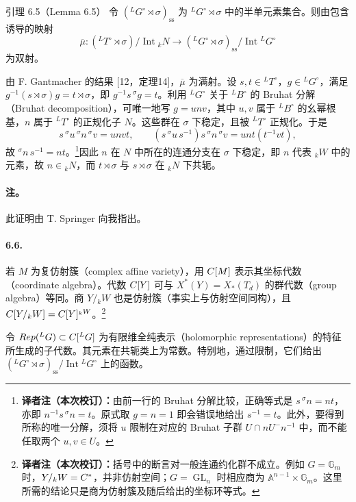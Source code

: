 \begin{originaltheorem}{引理 6.5（Lemma 6.5）}
令 $({}^LG^\circ\rtimes\sigma)_{\mathrm{ss}}$ 为 ${}^LG^\circ\rtimes\sigma$ 中的半单元素集合。则由包含诱导的映射
\[
 \overline\mu:({}^LT^\circ\rtimes\sigma)/\operatorname{Int}{}_kN
 \longrightarrow({}^LG^\circ\rtimes\sigma)_{\mathrm{ss}}/\operatorname{Int}{}^LG^\circ
\]
为双射。
\end{originaltheorem}
由 F. Gantmacher 的结果 [12，定理14]，$\overline\mu$ 为满射。设 $s,t\in{}^LT^\circ$，$g\in{}^LG^\circ$，满足 $g^{-1}(s\rtimes\sigma)g=t\rtimes\sigma$，即 $g^{-1}s\,{}^\sigma g=t$。利用 ${}^LG^\circ$ 关于 ${}^LB^\circ$ 的 Bruhat 分解（Bruhat decomposition），可唯一地写 $g=unv$，其中 $u,v$ 属于 ${}^LB^\circ$ 的幺幂根基，$n$ 属于 ${}^LT^\circ$ 的正规化子 $N$。这些群在 $\sigma$ 下稳定，且被 ${}^LT^\circ$ 正规化。于是
\[
 s\,{}^\sigma u\,{}^\sigma n\,{}^\sigma v=unvt,\qquad
 (s\,{}^\sigma u\,s^{-1})s\,{}^\sigma n\,{}^\sigma v=unt(t^{-1}vt),
\]
故 ${}^\sigma n\,s^{-1}=nt$。\footnote{\textbf{译者注（本次校订）：}由前一行的 Bruhat 分解比较，正确等式是 $s\,{}^\sigma n=nt$，亦即 $n^{-1}s\,{}^\sigma n=t$。原式取 $g=n=1$ 即会错误地给出 $s^{-1}=t$。此外，要得到所称的唯一分解，须将 $u$ 限制在对应的 Bruhat 子群 $U\cap nU^-n^{-1}$ 中，而不能任取两个 $u,v\in U$。}因此 $n$ 在 $N$ 中所在的连通分支在 $\sigma$ 下稳定，即 $n$ 代表 ${}_kW$ 中的元素，故 $n\in{}_kN$，而 $t\rtimes\sigma$ 与 $s\rtimes\sigma$ 在 ${}_kN$ 下共轭。

\paragraph*{注。} 此证明由 T. Springer 向我指出。

\paragraph*{6.6.} 若 $M$ 为复仿射簇（complex affine variety），用 $C[M]$ 表示其坐标代数（coordinate algebra）。代数 $C[Y]$ 可与 $X^*(Y)=X_*(T_d)$ 的群代数（group algebra）等同。商 $Y/{}_kW$ 也是仿射簇（事实上与仿射空间同构），且 $C[Y/{}_kW]=C[Y]^{{}_kW}$。\footnote{\textbf{译者注（本次校订）：}括号中的断言对一般连通约化群不成立。例如 $G=\mathbb G_m$ 时，$Y/{}_kW=C^*$，并非仿射空间；$G=\operatorname{GL}_n$ 时相应商为 $\mathbb A^{n-1}\times\mathbb G_m$。这里所需的结论只是商为仿射簇及随后给出的坐标环等式。}

令 $Rep({}^LG)\subset C[{}^LG]$ 为有限维全纯表示（holomorphic representations）的特征所生成的子代数。其元素在共轭类上为常数。特别地，通过限制，它们给出 $({}^LG^\circ\rtimes\sigma)_{\mathrm{ss}}/\operatorname{Int}{}^LG^\circ$ 上的函数。

